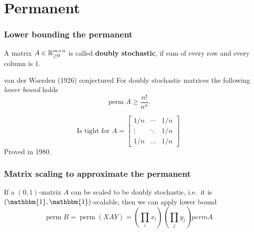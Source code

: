\documentclass{beamer}
\DeclareMathOperator*{\perm}{perm}
\begin{document}
\section{Permanent}%
\label{sec:}

\begin{frame}
  \frametitle{Lower bounding the permanent}
  \begin{definition}
    A matrix $A \in \mathbb{R}^{m\times n}_{\ge0}$ is called \textbf{doubly stochastic}, if sum of every row and every column is $1$.
  \end{definition}

  \begin{block}{van der Waerden (1926) conjectured}
    For doubly stochastic matrices the following \emph{lower bound} holds
    \begin{equation}
      \perm A \ge \frac{n!}{n^n}.
    \end{equation}
  \end{block}
  \begin{equation}
   \text{Is tight for } A = \begin{bmatrix}
      1/n & \cdots & 1/n \\
      \vdots & \ddots & 1/n \\
      1/n & \dots & 1/n
    \end{bmatrix}
  \end{equation}
  Proved in 1980.
\end{frame}


\begin{frame}
  \frametitle{Matrix scaling to approximate the permanent}
  \begin{block}{}
    If a $(0, 1)$-matrix $A$ can be scaled to be doubly stochastic, i.e.\ it is $\left(\mathbbm{1}, \mathbbm{1}\right)$-scalable, then
    we can apply lower bound
    \begin{equation}
      \perm B = \perm (XAY) = \left(\prod_i x_i\right) \left(\prod_j y_j\right) perm A
    \end{equation}
  \end{block}
\end{frame}
\end{document}
